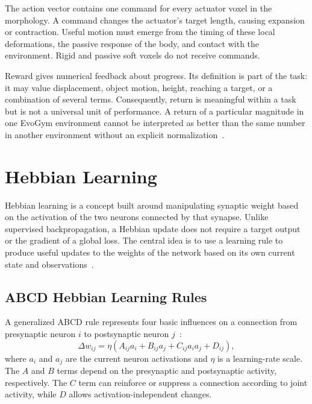 The action vector contains one command for every actuator voxel in the morphology. A command changes the actuator's target length, causing expansion or contraction. Useful motion must emerge from the timing of these local deformations, the passive response of the body, and contact with the environment. Rigid and passive soft voxels do not receive commands.

Reward gives numerical feedback about progress. Its definition is part of the task: it may value displacement, object motion, height, reaching a target, or a combination of several terms. Consequently, return is meaningful within a task but is not a universal unit of performance. A return of a particular magnitude in one EvoGym environment cannot be interpreted as better than the same number in another environment without an explicit normalization~\cite{bhatia2021evolution}.

\section{Hebbian Learning}

Hebbian learning is a concept built around manipulating synaptic weight based on the activation of the two neurons connected by that synapse. Unlike supervised backpropagation, a Hebbian update does not require a target output or the gradient of a global loss. The central idea is to use a learning rule to produce useful updates to the weights of the network based on its own current state and observations~\cite{ferigo2024nchl,ferigo2023voxelhebbian}.

\subsection{ABCD Hebbian Learning Rules}

A generalized ABCD rule represents four basic influences on a connection from presynaptic neuron $i$ to postsynaptic neuron $j$~\cite{ferigo2024nchl,ferigo2023voxelhebbian}:
\begin{equation}
  \Delta w_{ij} = \eta\left(
    A_{ij}a_i + B_{ij}a_j + C_{ij}a_i a_j + D_{ij}
  \right),
  \label{eq:abcd}
\end{equation}
where $a_i$ and $a_j$ are the current neuron activations and $\eta$ is a learning-rate scale. The $A$ and $B$ terms depend on the presynaptic and postsynaptic activity, respectively. The $C$ term can reinforce or suppress a connection according to joint activity, while $D$ allows activation-independent changes.

